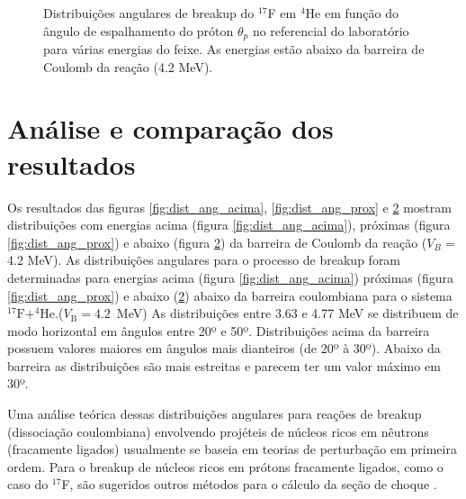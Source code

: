 \documentclass[a4paper,12pt,oneside]{book}
\begin{document}
\begin{figure}[H]
\begin{subfigure}[b]{0.48\textwidth}
        \caption{}
        \label{subfig:dist_ang_ab}
    \end{subfigure}
\caption{Distribuições angulares de breakup do $^{17}$F em $^4$He em função do ângulo de espalhamento do próton $\theta_p$ no referencial do laboratório para várias energias do feixe. As energias estão abaixo da barreira de Coulomb da reação (4.2 MeV).}
\label{fig:dist_ang_abaixo}
\end{figure}
\section{Análise e comparação dos resultados}

\par Os resultados das figuras \ref{fig:dist_ang_acima}, \ref{fig:dist_ang_prox} e \ref{fig:dist_ang_abaixo} mostram distribuições com energias acima (figura \ref{fig:dist_ang_acima}), próximas (figura \ref{fig:dist_ang_prox}) e abaixo (figura \ref{fig:dist_ang_abaixo}) da barreira de Coulomb da reação ($V_B$ = 4.2 MeV). As distribuições angulares para o processo de breakup foram determinadas para energias acima (figura \ref{fig:dist_ang_acima}) próximas (figura \ref{fig:dist_ang_prox}) e abaixo (\ref{fig:dist_ang_abaixo}) abaixo da barreira coulombiana para o sistema $^{17}\mathrm{F}+^{4}\mathrm{He}$.($V_\mathrm{B}=4.2$~MeV) As distribuições entre 3.63 e 4.77 MeV se distribuem de modo horizontal em ângulos entre 20º e 50º. Distribuições acima da barreira possuem valores maiores em ângulos mais dianteiros (de 20º à 30º). Abaixo da barreira as distribuições são mais estreitas e parecem ter um valor máximo em 30º.

\par Uma análise teórica dessas distribuições angulares para reações de breakup (dissociação coulombiana) envolvendo projéteis de núcleos ricos em nêutrons (fracamente ligados) usualmente se baseia em teorias de perturbação em primeira ordem. Para o breakup de núcleos ricos em prótons fracamente ligados, como o caso do $^{17}$F, são sugeridos outros métodos para o cálculo da seção de choque \cite{LIANG200922, BERTULANI2003199}.
\end{document}
